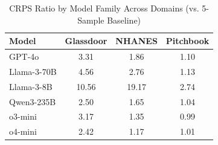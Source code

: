 \begin{table}[h]
\centering
\caption{CRPS Ratio by Model Family Across Domains (vs. 5-Sample Baseline)}
\label{tab:crps_ratio_by_model}
\begin{tabular}{lccc}
\hline
Model & Glassdoor & NHANES & Pitchbook \\
\hline
GPT-4o & 3.31 & 1.86 & 1.10 \\
Llama-3-70B & 4.56 & 2.76 & 1.13 \\
Llama-3-8B & 10.56 & 19.17 & 2.74 \\
Qwen3-235B & 2.50 & 1.65 & 1.04 \\
o3-mini & 3.17 & 1.35 & 0.99 \\
o4-mini & 2.42 & 1.17 & 1.01 \\
\hline
\end{tabular}
\end{table}